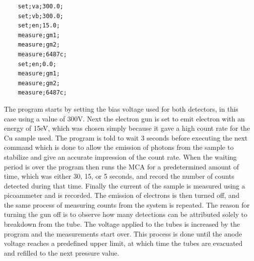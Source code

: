 \begin{center}
  \begin{verbatim}
    set;va;300.0;
    set;vb;300.0;
    set;en;15.0;
    measure;gm1;
    measure;gm2;
    measure;6487c;
    set;en;0.0;
    measure;gm1;
    measure;gm2;
    measure;6487c;
  \end{verbatim}
\end{center}

The program starts by setting the bias voltage used for both detectors, in this case using a value of 300V. Next the electron gun is set to emit electron with an energy of 15eV, 
which was chosen simply because it gave a high count rate for the Cu sample used. The program is told to wait 3 seconds before executing the next command which is done to allow the emission of photons from the sample to stabilize and give an accurate impression 
of the count rate. When the waiting period is over the program then runs the MCA for a predetermined amount of time, which was either 30, 15, or 5 seconds, and record the number of counts
detected during that time. Finally the current of the sample is measured using a picoammeter and is recorded. The emission of electrons is then turned off, and the same process of 
measuring counts from the system is repeated. The reason for turning the gun off is to observe how many detections can be attributed solely to breakdown from the tube. The voltage 
applied to the tubes is increased by the program and the measurements start over. This process is done until the anode voltage reaches a predefined upper limit, at which time the tubes 
are evacuated and refilled to the next pressure value. 